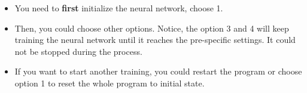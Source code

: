 \documentclass[11pt]{article}
\begin{document}
\begin{itemize}
\item You need to \textbf{first} initialize the neural network, choose 1.
\item Then, you could choose other options. Notice, the option 3 and 4 will keep training the neural network until it reaches the pre-specific settings. It could not be stopped during the process.
\item If you want to start another training, you could restart the program or choose option 1 to reset the whole program to initial state.
\end{itemize}
\end{document}
